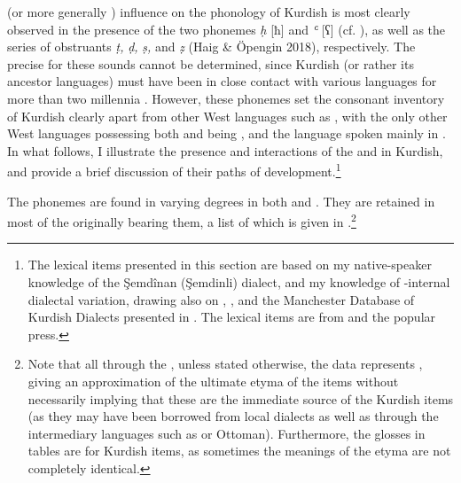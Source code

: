 \documentclass[output=paper]{langsci/langscibook}
\begin{document}
 (or more generally ) influence on the phonology of Kurdish is most clearly observed in the presence of the two  phonemes \textit{ḥ} [ħ] and \textit{ʿ} [ʕ] (cf. \citealt{Kahn1976,Haig2007,Anonbyforthcoming,Barryforthcoming}), as well as the series of  obstruants \textit{ṭ,} \textit{ḍ,} \textit{ṣ,} and \textit{ẓ} (Haig \& Öpengin 2018), respectively. The precise   for these sounds cannot be determined, since Kurdish (or rather its ancestor languages) must have been in close contact with various  languages for more than two millennia \citep[69]{Utas2005}. However, these phonemes set the consonant inventory of Kurdish clearly apart from other West  languages such as , with the only other West  languages possessing both  and  being , and the  language spoken mainly in  \citep{Anonbyforthcoming}. In what follows, I illustrate the presence and interactions of the  and  in Kurdish, and provide a brief discussion of their paths of development.\footnote{The  lexical items presented in this section are based on my native-speaker knowledge of the Şemdînan (Şemdinli) dialect, and my knowledge of -internal dialectal variation, drawing also on \citep{Chyet2003}, \citep{ÖpenginHaig2014}, and the  Manchester Database of Kurdish Dialects presented in \citep{MatrasKoontz-Garboden2016}. The  lexical items are from \citet{Öpengin2016} and the popular press.}  

The  phonemes are found in varying degrees in both  and . They are retained in most of the   originally bearing them, a list of which is given in .\footnote{Note that all through the , unless stated otherwise, the  data represents  , giving an approximation of the ultimate  etyma of the items without necessarily implying that these are the immediate source of the Kurdish items (as they may have been borrowed from local  dialects as well as through the intermediary languages such as  or Ottoman). Furthermore, the glosses in tables are for Kurdish items, as sometimes the meanings of the  etyma are not completely identical.} 
\end{document}

